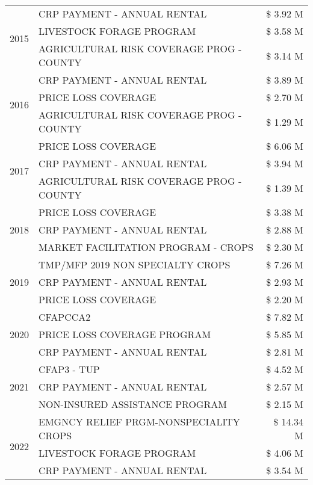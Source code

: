 \begin{tabular}{llr}
\cline{1-3}
\multirow[t]{3}{*}{2015} & CRP PAYMENT - ANNUAL RENTAL & \$ 3.92 M \\
 & LIVESTOCK FORAGE PROGRAM & \$ 3.58 M \\
 & AGRICULTURAL RISK COVERAGE PROG - COUNTY & \$ 3.14 M \\
\cline{1-3}
\multirow[t]{3}{*}{2016} & CRP PAYMENT - ANNUAL RENTAL & \$ 3.89 M \\
 & PRICE LOSS COVERAGE & \$ 2.70 M \\
 & AGRICULTURAL RISK COVERAGE PROG - COUNTY & \$ 1.29 M \\
\cline{1-3}
\multirow[t]{3}{*}{2017} & PRICE LOSS COVERAGE & \$ 6.06 M \\
 & CRP PAYMENT - ANNUAL RENTAL & \$ 3.94 M \\
 & AGRICULTURAL RISK COVERAGE PROG - COUNTY & \$ 1.39 M \\
\cline{1-3}
\multirow[t]{3}{*}{2018} & PRICE LOSS COVERAGE & \$ 3.38 M \\
 & CRP PAYMENT - ANNUAL RENTAL & \$ 2.88 M \\
 & MARKET FACILITATION PROGRAM - CROPS & \$ 2.30 M \\
\cline{1-3}
\multirow[t]{3}{*}{2019} & TMP/MFP 2019 NON SPECIALTY CROPS & \$ 7.26 M \\
 & CRP PAYMENT - ANNUAL RENTAL & \$ 2.93 M \\
 & PRICE LOSS COVERAGE & \$ 2.20 M \\
\cline{1-3}
\multirow[t]{3}{*}{2020} & CFAPCCA2 & \$ 7.82 M \\
 & PRICE LOSS COVERAGE PROGRAM & \$ 5.85 M \\
 & CRP PAYMENT - ANNUAL RENTAL & \$ 2.81 M \\
\cline{1-3}
\multirow[t]{3}{*}{2021} & CFAP3 - TUP & \$ 4.52 M \\
 & CRP PAYMENT - ANNUAL RENTAL & \$ 2.57 M \\
 & NON-INSURED ASSISTANCE PROGRAM & \$ 2.15 M \\
\cline{1-3}
\multirow[t]{3}{*}{2022} & EMGNCY RELIEF PRGM-NONSPECIALITY CROPS & \$ 14.34 M \\
 & LIVESTOCK FORAGE PROGRAM & \$ 4.06 M \\
 & CRP PAYMENT - ANNUAL RENTAL & \$ 3.54 M \\
\cline{1-3}
\bottomrule
\end{tabular}
